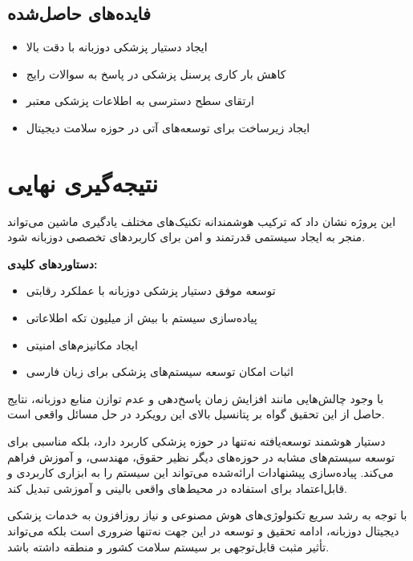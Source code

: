 \documentclass[11pt, a4paper, oneside]{book}
\begin{document}
	\subsection{فایده‌های حاصل‌شده}

	\begin{itemize}
		\item ایجاد دستیار پزشکی دوزبانه با دقت بالا
		\item کاهش بار کاری پرسنل پزشکی در پاسخ به سوالات رایج
		\item ارتقای سطح دسترسی به اطلاعات پزشکی معتبر
		\item ایجاد زیرساخت برای توسعه‌های آتی در حوزه سلامت دیجیتال
	\end{itemize}

	\section{نتیجه‌گیری نهایی}

	این پروژه نشان داد که ترکیب هوشمندانه تکنیک‌های مختلف یادگیری ماشین می‌تواند منجر به ایجاد سیستمی قدرتمند و امن برای کاربردهای تخصصی دوزبانه شود. 

	\textbf{دستاوردهای کلیدی:}
	\begin{itemize}
		\item توسعه موفق دستیار پزشکی دوزبانه با عملکرد رقابتی
		\item پیاده‌سازی سیستم  با بیش از  میلیون تکه اطلاعاتی
		\item ایجاد مکانیزم‌های امنیتی
		\item اثبات امکان توسعه سیستم‌های  پزشکی برای زبان فارسی
	\end{itemize}

	با وجود چالش‌هایی مانند افزایش زمان پاسخ‌دهی و عدم توازن منابع دوزبانه، نتایج حاصل از این تحقیق گواه بر پتانسیل بالای این رویکرد در حل مسائل واقعی است.

	دستیار هوشمند توسعه‌یافته نه‌تنها در حوزه پزشکی کاربرد دارد، بلکه  مناسبی برای توسعه سیستم‌های مشابه در حوزه‌های دیگر نظیر حقوق، مهندسی، و آموزش فراهم می‌کند. پیاده‌سازی پیشنهادات ارائه‌شده می‌تواند این سیستم را به ابزاری کاربردی و قابل‌اعتماد برای استفاده در محیط‌های واقعی بالینی و آموزشی تبدیل کند.

	با توجه به رشد سریع تکنولوژی‌های هوش مصنوعی و نیاز روزافزون به خدمات پزشکی دیجیتال دوزبانه، ادامه تحقیق و توسعه در این جهت نه‌تنها ضروری است بلکه می‌تواند تأثیر مثبت قابل‌توجهی بر سیستم سلامت کشور و منطقه داشته باشد.

	
	\setLTRbibitems
	\makeatletter
	\makeatother
	
	
\end{document}
